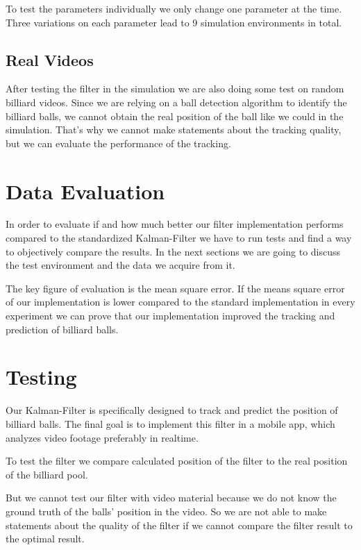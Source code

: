 \documentclass[titlepage, a4paper, 11pt]{scrartcl}
\begin{document}
            To test the parameters individually we only change one parameter at the time.
            Three variations on each parameter lead to 9 simulation environments in total.

        \subsection{Real Videos}

        After testing the filter in the simulation we are also doing some test on random billiard videos.
        Since we are relying on a ball detection algorithm to identify the billiard balls, we cannot obtain the real position of the ball like we could in the simulation.
        That's why we cannot make statements about the tracking quality, but we can evaluate the performance of the tracking.

    \section{Data Evaluation}

    In order to evaluate if and how much better our filter implementation performs
    compared to the standardized Kalman-Filter
    we have to run tests and find a way to objectively compare the results.
    In the next sections we are going to discuss the test environment and the data we acquire from it.

    The key figure of evaluation is the mean square error.
    If the means square error of our implementation is lower compared to the standard implementation in every experiment we can prove that our implementation improved the tracking and prediction of billiard balls.


    \section{Testing}

    Our Kalman-Filter is specifically designed to track and predict the position of billiard balls.
    The final goal is to implement this filter in a mobile app, which analyzes video footage preferably in realtime.

    To test the filter we compare calculated position of the filter to the real position of the billiard pool.

    But we cannot test our filter with video material because we do not know the ground truth of the balls' position in the video.
    So we are not able to make statements about the quality of the filter if we cannot compare the filter result to the optimal result.
\end{document}
